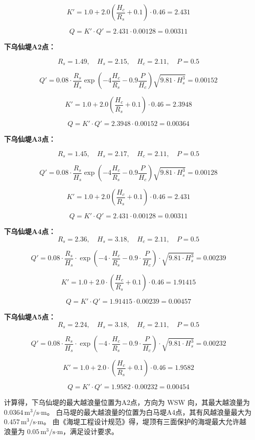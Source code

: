 \documentclass[UTF8, a4paper, 12pt]{ctexart} %
\begin{document}
\[
K' = 1.0 + 2.0 \left(\frac{H_c}{R_s} + 0.1\right) \cdot 0.46 = 2.431
\]

\[
Q = K' \cdot Q' = 2.431 \cdot 0.00128 = 0.00311
\]

\textbf{下乌仙堤A2点：}

\[
R_s = 1.49, \quad H_s = 2.15, \quad H_c = 2.11, \quad P = 0.5
\]

\[
Q' = 0.08 \cdot \frac{R_s}{H_s} \exp\left(-4 \frac{H_c}{R_s} - 0.9 \frac{P}{H_c}\right) \sqrt{9.81 \cdot H_s^3} = 0.00152
\]

\[
K' = 1.0 + 2.0 \left(\frac{H_c}{R_s} + 0.1\right) \cdot 0.46 = 2.3948
\]

\[
Q = K' \cdot Q' = 2.3948 \cdot 0.00152 = 0.00364
\]

\textbf{下乌仙堤A3点：}

\[
R_s = 1.45, \quad H_s = 2.17, \quad H_c = 2.11, \quad P = 0.5
\]

\[
Q' = 0.08 \cdot \frac{R_s}{H_s} \exp\left(-4 \frac{H_c}{R_s} - 0.9 \frac{P}{H_c}\right) \sqrt{9.81 \cdot H_s^3} = 0.00128
\]

\[
K' = 1.0 + 2.0 \left(\frac{H_c}{R_s} + 0.1\right) \cdot 0.46 = 2.431
\]

\[
Q = K' \cdot Q' = 2.431 \cdot 0.00128 = 0.00311
\]

\textbf{下乌仙堤A4点：}
\[
R_s = 2.36, \quad H_s = 3.18, \quad H_c = 2.11, \quad P = 0.5
\]

\[
Q' = 0.08 \cdot \frac{R_s}{H_s} \cdot \exp\left(-4 \cdot \frac{H_c}{R_s} - 0.9 \cdot \frac{P}{H_c}\right) \cdot \sqrt{9.81 \cdot H_s^3} = 0.00239
\]

\[
K' = 1.0 + 2.0 \cdot \left(\frac{H_c}{R_s} + 0.1\right) \cdot 0.46 = 1.91415
\]

\[
Q = K' \cdot Q' = 1.91415 \cdot 0.00239 = 0.00457
\]

\textbf{下乌仙堤A5点：}
\[
R_s = 2.24, \quad H_s = 3.18, \quad H_c = 2.11, \quad P = 0.5
\]

\[
Q' = 0.08 \cdot \frac{R_s}{H_s} \cdot \exp\left(-4 \cdot \frac{H_c}{R_s} - 0.9 \cdot \frac{P}{H_c}\right) \cdot \sqrt{9.81 \cdot H_s^3} = 0.00232
\]

\[
K' = 1.0 + 2.0 \cdot \left(\frac{H_c}{R_s} + 0.1\right) \cdot 0.46 = 1.9582
\]

\[
Q = K' \cdot Q' = 1.9582 \cdot 0.00232 = 0.00454
\]

计算得，下乌仙堤的最大越浪量位置为A2点，方向为 WSW 向，其最大越浪量为 $0.0364\,\text{m}^3/\text{s·m}$。
白马堤的最大越浪量的位置为白马堤A4点，其有风越浪量最大为 $0.457\,\text{m}^3/\text{s·m}$。
由《海堤工程设计规范》得，堤顶有三面保护的海堤最大允许越浪量为 $0.05\,\text{m}^3/\text{s·m}$，满足设计要求。
\end{document}

